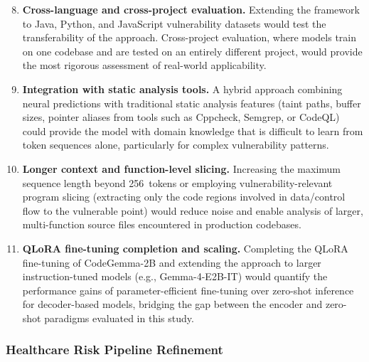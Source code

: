 \begin{enumerate}
    \setcounter{enumi}{7}
    \item \textbf{Cross-language and cross-project evaluation.}
          Extending the framework to Java, Python, and JavaScript
          vulnerability datasets would test the transferability of the
          approach.  Cross-project evaluation, where models train on one
          codebase and are tested on an entirely different project, would
          provide the most rigorous assessment of real-world applicability.

    \item \textbf{Integration with static analysis tools.}
          A hybrid approach combining neural predictions with traditional
          static analysis features (taint paths, buffer sizes, pointer
          aliases from tools such as Cppcheck, Semgrep, or CodeQL) could
          provide the model with domain knowledge that is difficult to learn
          from token sequences alone, particularly for complex
          vulnerability patterns.

    \item \textbf{Longer context and function-level slicing.}
          Increasing the maximum sequence length beyond 256~tokens or
          employing vulnerability-relevant program slicing (extracting only
          the code regions involved in data/control flow to the vulnerable
          point) would reduce noise and enable analysis of larger,
          multi-function source files encountered in production codebases.

    \item \textbf{QLoRA fine-tuning completion and scaling.}
          Completing the QLoRA fine-tuning of CodeGemma-2B and extending the
          approach to larger instruction-tuned models (e.g., Gemma-4-E2B-IT)
          would quantify the performance gains of parameter-efficient
          fine-tuning over zero-shot inference for decoder-based models,
          bridging the gap between the encoder and zero-shot paradigms
          evaluated in this study.
\end{enumerate}

\subsubsection{Healthcare Risk Pipeline Refinement}

